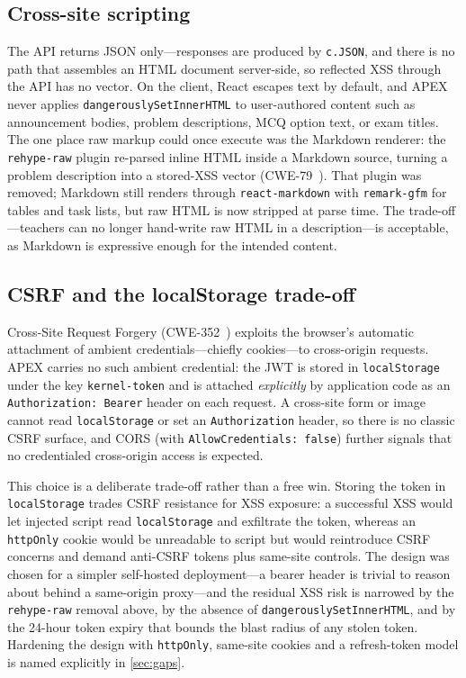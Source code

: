 \subsection{Cross-site scripting}

The API returns JSON only---responses are produced by \texttt{c.JSON}, and there
is no path that assembles an HTML document server-side, so reflected XSS through
the API has no vector. On the client, React escapes text by default, and APEX
never applies \texttt{dangerouslySetInnerHTML} to user-authored content such as
announcement bodies, problem descriptions, MCQ option text, or exam titles. The
one place raw markup could once execute was the Markdown renderer: the
\texttt{rehype-raw} plugin re-parsed inline HTML inside a Markdown source,
turning a problem description into a stored-XSS vector (CWE-79~\cite{cwe-79}).
That plugin was removed; Markdown still renders through \texttt{react-markdown}
with \texttt{remark-gfm} for tables and task lists, but raw HTML is now stripped
at parse time. The trade-off---teachers can no longer hand-write raw HTML in a
description---is acceptable, as Markdown is expressive enough for the intended
content.

\subsection{CSRF and the localStorage trade-off}

Cross-Site Request Forgery (CWE-352~\cite{cwe-352}) exploits the browser's
automatic attachment of ambient credentials---chiefly cookies---to
cross-origin requests. APEX carries no such ambient credential: the JWT is stored
in \texttt{localStorage} under the key \texttt{kernel-token} and is attached
\emph{explicitly} by application code as an \texttt{Authorization:\ Bearer}
header on each request. A cross-site form or image cannot read
\texttt{localStorage} or set an \texttt{Authorization} header, so there is no
classic CSRF surface, and CORS (with \texttt{AllowCredentials:\ false}) further
signals that no credentialed cross-origin access is expected.

This choice is a deliberate trade-off rather than a free win. Storing the token in
\texttt{localStorage} trades CSRF resistance for XSS exposure: a successful XSS
would let injected script read \texttt{localStorage} and exfiltrate the token,
whereas an \texttt{httpOnly} cookie would be unreadable to script but would
reintroduce CSRF concerns and demand anti-CSRF tokens plus same-site controls.
The design was chosen for a simpler self-hosted deployment---a bearer header is
trivial to reason about behind a same-origin proxy---and the residual XSS risk is
narrowed by the \texttt{rehype-raw} removal above, by the absence of
\texttt{dangerouslySetInnerHTML}, and by the 24-hour token expiry that bounds the
blast radius of any stolen token. Hardening the design with \texttt{httpOnly},
same-site cookies and a refresh-token model is named explicitly in
\cref{sec:gaps}.

